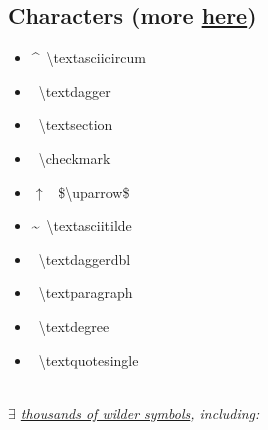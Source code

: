 
\subsection*{Characters (more \href{http://tug.ctan.org/info/symbols/comprehensive/symbols-a4.pdf}{here})}

\begin{minipage}{3cm}
\begin{itemize}[label=\empty,leftmargin=*]
    \item \textasciicircum \, \textbackslash textasciicircum
    \item \textdagger \, \textbackslash textdagger
    \item \textsection \, \textbackslash textsection
    \item \checkmark \, \textbackslash checkmark
    \item $\uparrow$ \, \$\textbackslash uparrow\$
\end{itemize} 
\end{minipage}
\begin{minipage}{3cm}
\begin{itemize}[label={},leftmargin=*]
    \item \textasciitilde \, \textbackslash textasciitilde
    \item \textdaggerdbl \, \textbackslash textdaggerdbl
    \item \textparagraph \, \textbackslash textparagraph
    \item \textdegree \, \textbackslash textdegree
    \item \textquotesingle \, \textbackslash textquotesingle
\end{itemize} 
\end{minipage}\ \\[1mm]
%
\textit{$\exists$ \href{http://tug.ctan.org/info/symbols/comprehensive/symbols-a4.pdf}{thousands of wilder symbols}, including:} \\%
\\
\\
